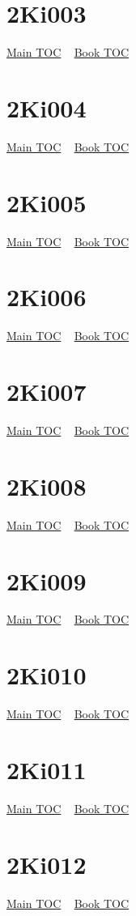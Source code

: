 \documentclass{book}
\begin{document}
  \section{2Ki003}\hyperlink{toc}{Main TOC} ~ \hyperref[subsec:2Ki]{Book TOC} 
  \section{2Ki004}\hyperlink{toc}{Main TOC} ~ \hyperref[subsec:2Ki]{Book TOC} 
  \section{2Ki005}\hyperlink{toc}{Main TOC} ~ \hyperref[subsec:2Ki]{Book TOC} 
  \section{2Ki006}\hyperlink{toc}{Main TOC} ~ \hyperref[subsec:2Ki]{Book TOC} 
  \section{2Ki007}\hyperlink{toc}{Main TOC} ~ \hyperref[subsec:2Ki]{Book TOC} 
  \section{2Ki008}\hyperlink{toc}{Main TOC} ~ \hyperref[subsec:2Ki]{Book TOC} 
  \section{2Ki009}\hyperlink{toc}{Main TOC} ~ \hyperref[subsec:2Ki]{Book TOC} 
  \section{2Ki010}\hyperlink{toc}{Main TOC} ~ \hyperref[subsec:2Ki]{Book TOC} 
  \section{2Ki011}\hyperlink{toc}{Main TOC} ~ \hyperref[subsec:2Ki]{Book TOC} 
  \section{2Ki012}\hyperlink{toc}{Main TOC} ~ \hyperref[subsec:2Ki]{Book TOC} 
\end{document}
